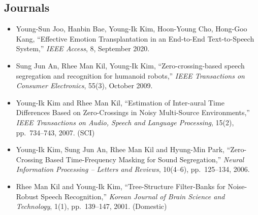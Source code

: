 \documentclass[11pt,a4paper]{article}
\begin{document}
\subsection*{Journals}
\begin{itemize}[leftmargin=*]
\item Young-Sun Joo, Hanbin Bae, Young-Ik Kim, Hoon-Young Cho, Hong-Goo Kang, ``Effective Emotion Transplantation in an End-to-End Text-to-Speech System,'' \textit{IEEE Access}, 8, September 2020. 
\item Sung Jun An, Rhee Man Kil, Young-Ik Kim, ``Zero-crossing-based speech segregation and recognition for humanoid robots,'' \textit{IEEE Transactions on Consumer Electronics}, 55(3), October 2009.
\item Young-Ik Kim and Rhee Man Kil, ``Estimation of Inter-aural Time Differences Based on Zero-Crossings in Noisy Multi-Source Environments,'' \textit{IEEE Transactions on Audio, Speech and Language Processing}, 15(2), pp.~734--743, 2007. (SCI)
\item Young-Ik Kim, Sung Jun An, Rhee Man Kil and Hyung-Min Park, ``Zero-Crossing Based Time-Frequency Masking for Sound Segregation,'' \textit{Neural Information Processing -- Letters and Reviews}, 10(4--6), pp.~125--134, 2006. 
\item Rhee Man Kil and Young-Ik Kim, ``Tree-Structure Filter-Banks for Noise-Robust Speech Recognition,'' \textit{Korean Journal of Brain Science and Technology}, 1(1), pp.~139--147, 2001. (Domestic)
\end{itemize}
\end{document}
